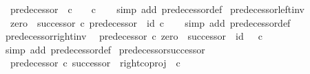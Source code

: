 \begin{isabellebody}
\ \ {\isachardoublequoteopen}predecessor{\isacharprime}{\kern0pt}\ {\isacharcolon}{\kern0pt}\ {\isasymnat}\isactrlsub c\ {\isasymrightarrow}\ {\isasymone}\ {\isasymCoprod}\ {\isasymnat}\isactrlsub c{\isachardoublequoteclose}\isanewline
%
\isadelimproof
\ \ %
\endisadelimproof
%
\isatagproof
{}\isamarkupfalse%
\ {\isacharparenleft}{\kern0pt}simp\ add{\isacharcolon}{\kern0pt}\ predecessor{\isacharprime}{\kern0pt}{\isacharunderscore}{\kern0pt}def{}{\isacharparenright}{\kern0pt}%
\endisatagproof
{\isafoldproof}%
%
\isadelimproof
\isanewline
%
\endisadelimproof
\isanewline
{}\isamarkupfalse%
\ predecessor{\isacharprime}{\kern0pt}{\isacharunderscore}{\kern0pt}left{\isacharunderscore}{\kern0pt}inv{\isacharcolon}{\kern0pt}\isanewline
\ \ {\isachardoublequoteopen}{\isacharparenleft}{\kern0pt}zero\ {\isasymamalg}\ successor{\isacharparenright}{\kern0pt}\ {\isasymcirc}\isactrlsub c\ predecessor{\isacharprime}{\kern0pt}\ {\isacharequal}{\kern0pt}\ id\ {\isasymnat}\isactrlsub c{\isachardoublequoteclose}\isanewline
%
\isadelimproof
\ \ %
\endisadelimproof
%
\isatagproof
{}\isamarkupfalse%
\ {\isacharparenleft}{\kern0pt}simp\ add{\isacharcolon}{\kern0pt}\ predecessor{\isacharprime}{\kern0pt}{\isacharunderscore}{\kern0pt}def{}{\isacharparenright}{\kern0pt}%
\endisatagproof
{\isafoldproof}%
%
\isadelimproof
\isanewline
%
\endisadelimproof
\isanewline
{}\isamarkupfalse%
\ predecessor{\isacharprime}{\kern0pt}{\isacharunderscore}{\kern0pt}right{\isacharunderscore}{\kern0pt}inv{\isacharcolon}{\kern0pt}\isanewline
\ \ {\isachardoublequoteopen}predecessor{\isacharprime}{\kern0pt}\ {\isasymcirc}\isactrlsub c\ {\isacharparenleft}{\kern0pt}zero\ {\isasymamalg}\ successor{\isacharparenright}{\kern0pt}\ {\isacharequal}{\kern0pt}\ id\ {\isacharparenleft}{\kern0pt}{\isasymone}\ {\isasymCoprod}\ {\isasymnat}\isactrlsub c{\isacharparenright}{\kern0pt}{\isachardoublequoteclose}\isanewline
%
\isadelimproof
\ \ %
\endisadelimproof
%
\isatagproof
{}\isamarkupfalse%
\ {\isacharparenleft}{\kern0pt}simp\ add{\isacharcolon}{\kern0pt}\ predecessor{\isacharprime}{\kern0pt}{\isacharunderscore}{\kern0pt}def{}{\isacharparenright}{\kern0pt}%
\endisatagproof
{\isafoldproof}%
%
\isadelimproof
\isanewline
%
\endisadelimproof
\isanewline
{}\isamarkupfalse%
\ predecessor{\isacharprime}{\kern0pt}{\isacharunderscore}{\kern0pt}successor{\isacharcolon}{\kern0pt}\isanewline
\ \ {\isachardoublequoteopen}predecessor{\isacharprime}{\kern0pt}\ {\isasymcirc}\isactrlsub c\ successor\ {\isacharequal}{\kern0pt}\ right{\isacharunderscore}{\kern0pt}coproj\ {\isasymone}\ {\isasymnat}\isactrlsub c{\isachardoublequoteclose}\isanewline

\end{isabellebody}
